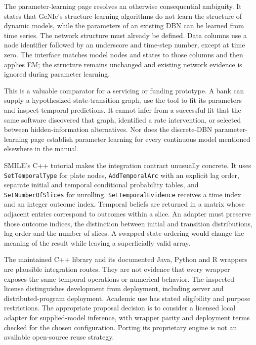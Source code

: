 The parameter-learning page resolves an otherwise consequential
ambiguity. It states that GeNIe's structure-learning algorithms do not
learn the structure of dynamic models, while the parameters of an
existing DBN can be learned from time series. The network structure must
already be defined. Data columns use a node identifier followed by an
underscore and time-step number, except at time zero. The interface
matches model nodes and states to those columns and then applies EM; the
structure remains unchanged and existing network evidence is ignored
during parameter learning. \citep{exec13_ct_genie_learning}

This is a valuable comparator for a servicing or funding prototype. A
bank can supply a hypothesized state-transition graph, use the tool to
fit its parameters and inspect temporal predictions. It cannot infer
from a successful fit that the same software discovered that graph,
identified a rate intervention, or selected between hidden-information
alternatives. Nor does the discrete-DBN parameter-learning page
establish parameter learning for every continuous model mentioned
elsewhere in the manual.

SMILE's C++ tutorial makes the integration contract unusually concrete.
It uses \texttt{SetTemporalType} for plate nodes,
\texttt{AddTemporalArc} with an explicit lag order, separate initial and
temporal conditional probability tables, and \texttt{SetNumberOfSlices}
for unrolling. \texttt{SetTemporalEvidence} receives a time index and an
integer outcome index. Temporal beliefs are returned in a matrix whose
adjacent entries correspond to outcomes within a slice. An adapter must
preserve those outcome indices, the distinction between initial and
transition distributions, lag order and the number of slices. A swapped
state ordering would change the meaning of the result while leaving a
superficially valid array.~\citep{exec13_ct_smile_tutorial}

The maintained C++ library and its documented Java, Python and R
wrappers are plausible integration routes. They are not evidence that
every wrapper exposes the same temporal operations or numerical
behavior. The inspected license distinguishes development from
deployment, including server and distributed-program deployment.
Academic use has stated eligibility and purpose restrictions. The
appropriate proposal decision is to consider a licensed local adapter
for supplied-model inference, with wrapper parity and deployment terms
checked for the chosen configuration. Porting its proprietary engine is
not an available open-source reuse strategy.
\citep{exec13_smile_intro,exec13_smile_license}

